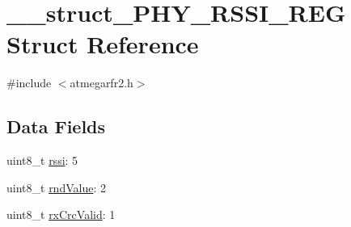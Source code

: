 \hypertarget{struct____struct___p_h_y___r_s_s_i___r_e_g}{\section{\-\_\-\-\_\-struct\-\_\-\-P\-H\-Y\-\_\-\-R\-S\-S\-I\-\_\-\-R\-E\-G Struct Reference}
\label{struct____struct___p_h_y___r_s_s_i___r_e_g}
}


{\ttfamily \#include $<$atmegarfr2.\-h$>$}

\subsection*{Data Fields}
\begin{DoxyCompactItemize}
\item 
uint8\-\_\-t \hyperlink{struct____struct___p_h_y___r_s_s_i___r_e_g_a870b6484678eab14277119ac70f3e871}{rssi}\-: 5
\item 
uint8\-\_\-t \hyperlink{struct____struct___p_h_y___r_s_s_i___r_e_g_a4d0c9956849721064feee1fb8a764f0e}{rnd\-Value}\-: 2
\item 
uint8\-\_\-t \hyperlink{struct____struct___p_h_y___r_s_s_i___r_e_g_ae05cd0b7590fbc76665d35a46ae0b955}{rx\-Crc\-Valid}\-: 1
\end{DoxyCompactItemize}


